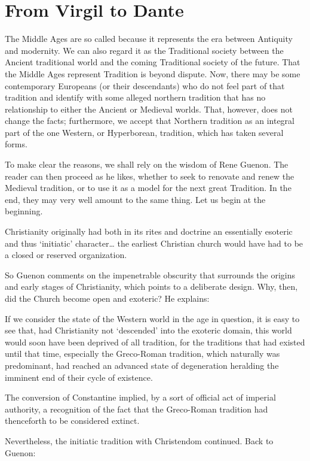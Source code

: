 \section{From Virgil to Dante}

The Middle Ages are so called because it represents the era between Antiquity and modernity. We can also regard it as the Traditional society between the Ancient traditional world and the coming Traditional society of the future. That the Middle Ages represent Tradition is beyond dispute. Now, there may be some contemporary Europeans (or their descendants) who do not feel part of that tradition and identify with some alleged northern tradition that has no relationship to either the Ancient or Medieval worlds. That, however, does not change the facts; furthermore, we accept that Northern tradition as an integral part of the one Western, or Hyperborean, tradition, which has taken several forms.

To make clear the reasons, we shall rely on the wisdom of Rene Guenon. The reader can then proceed as he likes, whether to seek to renovate and renew the Medieval tradition, or to use it as a model for the next great Tradition. In the end, they may very well amount to the same thing. Let us begin at the beginning.

\begin{quotex}
Christianity originally had both in its rites and doctrine an essentially esoteric and thus `initiatic' character… the earliest Christian church would have had to be a closed or reserved organization. 

\end{quotex}

So Guenon comments on the impenetrable obscurity that surrounds the origins and early stages of Christianity, which points to a deliberate design. Why, then, did the Church become open and exoteric? He explains:

\begin{quotex}
If we consider the state of the Western world in the age in question, it is easy to see that, had Christianity not `descended' into the exoteric domain, this world would soon have been deprived of all tradition, for the traditions that had existed until that time, especially the Greco-Roman tradition, which naturally was predominant, had reached an advanced state of degeneration heralding the imminent end of their cycle of existence.

The conversion of Constantine implied, by a sort of official act of imperial authority, a recognition of the fact that the Greco-Roman tradition had thenceforth to be considered extinct. 

\end{quotex}
Nevertheless, the initiatic tradition with Christendom continued. Back to Guenon:

